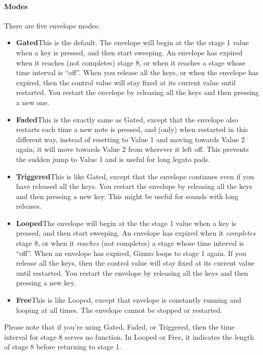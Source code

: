\documentclass{article}
\begin{document}
\paragraph{Modes}  There are five envelope modes:

\begin{itemize}
\item {\bf Gated}\quad This is the default.  The envelope will begin at the the stage 1 value when a key is pressed, and then start sweeping.  An envelope has expired when it reaches (not completes) stage 8, or when it reaches a stage whose time interval is ``off''.  When you release all the keys, or when the envelope has expired, then the control value will stay fixed at its current value until restarted.  You restart the envelope by releasing all the keys and then pressing a new one. 
\item {\bf Faded}\quad This is the exactly same as Gated, except that the envelope also restarts each time a new note is pressed, and (only) when restarted in this different way, instead of resetting to Value 1 and moving towards Value 2 again, it will move towards Value 2 from wherever it left off.  This prevents the sudden jump to Value 1 and is useful for long legato pads.
\item {\bf Triggered}\quad This is like Gated, except that the envelope continues even if you have released all the keys.  You restart the envelope by releasing all the keys and then pressing a new key.  This might be useful for sounds with long releases.
\item {\bf Looped}\quad The envelope will begin at the the stage 1 value when a key is pressed, and then start sweeping.  An envelope has expired when it {\it completes} stage 8, or when it {\it reaches} (not completes) a stage whose time interval is ``off''.  When an envelope has expired, Gizmo loops to stage 1 again.  If you release all the keys, then the control value will stay fixed at its current value until restarted.  You restart the envelope by releasing all the keys and then pressing a new key.
\item {\bf Free}\quad This is like Looped, except that envelope is constantly running and looping at all times.  The envelope cannot be stopped or restarted.
\end{itemize}

Please note that if you're using Gated, Faded, or Triggered, then the time interval for stage 8 serves no function.  In Looped or Free, it indicates the length of stage 8 before returning to stage 1.  
\end{document}
